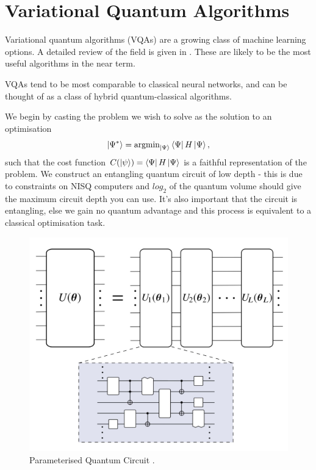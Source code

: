 \documentclass{article}
\theoremstyle{definition}
\begin{document}
\section{Variational Quantum Algorithms}
Variational quantum algorithms (VQAs) are a growing class of machine learning options. A detailed review of the field is given in \cite{cerezo2020variational}. These are likely to be the most useful algorithms in the near term. 

VQAs tend to be most comparable to classical neural networks, and can be thought of as a class of hybrid    quantum-classical algorithms. 

We begin by casting the problem we wish to solve as the solution to an optimisation
\[
\ket{\Psi^\ast} = \text{argmin}_{\ket{\Psi}} \bra{\Psi} H \ket{\Psi},
\]
such that the cost function $C(\ket{\psi}) = \bra{\Psi} H \ket{\Psi}$ is a faithful representation of the problem. We construct an entangling quantum circuit of low depth - this is due to constraints on NISQ computers and $log_2$ of the quantum volume should give the maximum circuit depth you can use. It's also important that the circuit is entangling, else we gain no quantum advantage and this process is equivalent to a classical optimisation task.

\begin{figure}[htb]
    \centering
    \includegraphics[scale=0.3]{VQA.jpg}
    \caption{Parameterised Quantum Circuit \cite{cerezo2020variational}. }
    \label{fig:my_label}
\end{figure}
\end{document}
